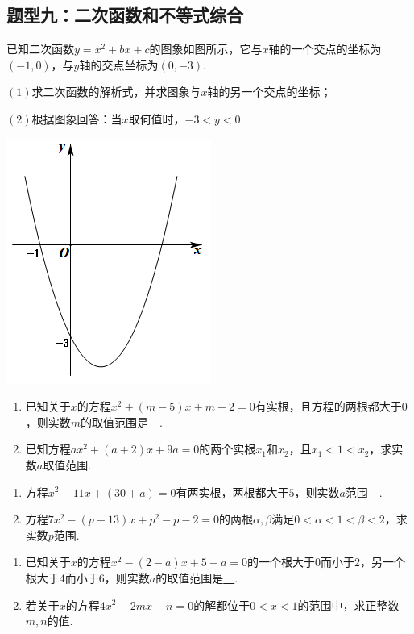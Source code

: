 \documentclass[10pt]{ctexart}
\begin{document}
\subsection{题型九：二次函数和不等式综合}
\begin{dkyi}{}{}
已知二次函数$y=x^2+bx+c$的图象如图所示，它与$x$轴的一个交点的坐标为$(-1,0)$，与$y$轴的交点坐标为$(0,-3)$.

$(1)$求二次函数的解析式，并求图象与$x$轴的另一个交点的坐标；

$(2)$根据图象回答：当$x$取何值时，$-3<y<0$.
\end{dkyi}

\includegraphics[scale=0.6]{figure/l-22.PNG} 
\begin{dkyi}{}{}
  \begin{enumerate}[(1)]
  \item 已知关于$x$的方程$x^2+(m-5)x+m-2=0$有实根，且方程的两根都大于$0$，则实数$m$的取值范围是\underline{~\hspace{1cm}~}.
  \item 已知方程$ax^2+(a+2)x+9a=0$的两个实根$x_1$和$x_2$，且$x_1<1<x_2$，求实数$a$取值范围.
  \end{enumerate}
\end{dkyi}
\begin{jply}{}{}
   \begin{enumerate}[(1)]
   \item 方程$x^2-11x+(30+a)=0$有两实根，两根都大于$5$，则实数$a$范围\underline{~\hspace{1cm}~}.
   \item 方程$7x^2-(p+13)x+p^2-p-2=0$的两根$\alpha,\beta$满足$0<\alpha<1<\beta<2$，求实数$p$范围.
   \end{enumerate}
\end{jply}
\begin{jply}{}{}
   \begin{enumerate}[(1)]
   \item 已知关于$x$的方程$x^2-(2-a)x+5-a=0$的一个根大于$0$而小于$2$，另一个根大于$4$而小于$6$，则实数$a$的取值范围是\underline{~\hspace{1cm}~}.
   \item 若关于$x$的方程$4x^2-2mx+n=0$的解都位于$0<x<1$的范围中，求正整数$m,n$的值.
   \end{enumerate}
\end{jply}
\end{document}
